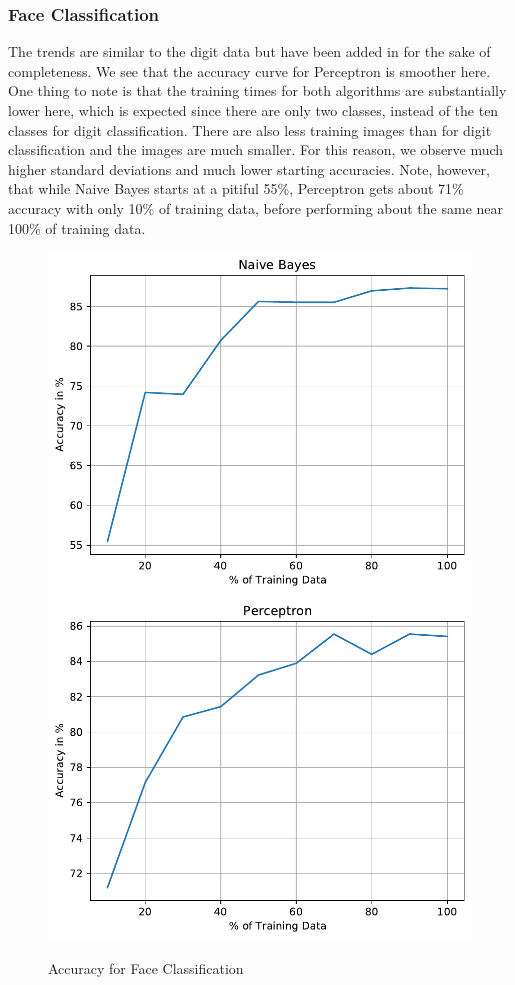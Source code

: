 \documentclass{article}
\begin{document}
  \subsubsection{Face Classification}
  The trends are similar to the digit data but have been added in for the sake of completeness. 
  We see that the accuracy curve for Perceptron is smoother here. 
  One thing to note is that the training times for both algorithms are substantially lower here, which is expected since there are only two classes, instead of the ten classes for digit classification.
  There are also less training images than for digit classification and the images are much smaller.
  For this reason, we observe much higher standard deviations and much lower starting accuracies.
  Note, however, that while Naive Bayes starts at a pitiful 55\%, Perceptron gets about 71\% accuracy with only 10\% of training data, before performing about the same near 100\% of training data.
  \begin{figure}[H]
  \includegraphics[width=0.45\linewidth]{figures/Naive Bayes_accuracy_FACE.pdf}\hfill
  \includegraphics[width=0.45\linewidth]{figures/Perceptron_accuracy_FACE.pdf}\hfill
  \caption{Accuracy for Face Classification}
  \end{figure}
\end{document}
